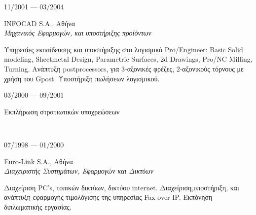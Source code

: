 \documentclass[11pt]{article} %
\begin{document}
{\begin{minipage}[t]{0.48\textwidth}

{\raggedleft\textsc{11/2001 --- 03/2004}\par}

{\raggedright\large INFOCAD S.A., Αθήνα\\
\textit{Μηχανικός Εφαρμογών, και υποστήριξης προϊόντων}\\[5pt]}

\normalsize{Υπηρεσίες εκπαίδευσης και υποστήριξης στο λογισμικό Pro/Engineer: Basic Solid modeling, Sheetmetal Design, 
Parametric Surfaces, 2d Drawings, Pro/NC Milling, Turning. Ανάπτυξη postprocessors, για 3-αξονικές φρέζες, 2-αξονικούς τόρνους
με χρήση του Gpost. Υποστήριξη πωλήσεων λογισμικού.}
\\


{\raggedleft\textsc{03/2000 --- 09/2001}\par}

{\raggedright\large Εκπλήρωση στρατιωτικών υποχρεώσεων}\\



{\raggedleft\textsc{07/1998 --- 01/2000}\par}

{\raggedright\large Euro-Link S.A.,  Αθήνα\\
\textit{Διαχειριστής Συστημάτων, Εφαρμογών και Δικτύων}\\[5pt]}

\normalsize{Διαχείριση PC's, τοπικών δικτύων, δικτύου internet. Διαχείριση,υποστήριξη, και ανάπτυξη εφαρμογής τιμολόγισης της υπηρεσίας Fax over IP. Εκπόνηση διπλωματικής εργασίας.}\\


%
%
%


\end{minipage}}
\end{document}

